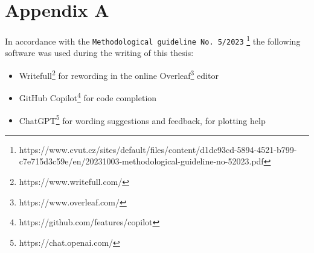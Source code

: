 
\appendix
\renewcommand\chaptername{Appendix}

\renewcommand{\thechapter}{A}
\renewcommand\chaptername{Appendix A}

\chapter{Appendix A}

In accordance with the \texttt{Methodological guideline No. 5/2023}
\footnote{https://www.cvut.cz/sites/default/files/content/d1dc93cd-5894-4521-b799-c7e715d3c59e/en/20231003-methodological-guideline-no-52023.pdf}
the following software was used during the writing of this thesis:
\begin{itemize}
    \item {Writefull\footnote{https://www.writefull.com/} for rewording in the online Overleaf\footnote{https://www.overleaf.com/} editor}
    \item {GitHub Copilot\footnote{https://github.com/features/copilot} for code completion}
    \item {ChatGPT\footnote{https://chat.openai.com/} for wording suggestions and feedback, for plotting help}
\end{itemize}